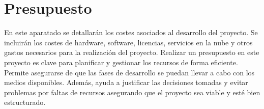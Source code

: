 \begin{table}[ht]
    \centering
    \caption{Tabla de tareas y horas}

\end{table}

\newpage

\section{Presupuesto}
\label{sec:presupuesto}
En este aparatado se detallarán los costes asociados al desarrollo del proyecto. Se incluirán los costes de hardware, software, licencias, servicios en la nube y otros gastos necesarios para la realización del proyecto.
Realizar un presupuesto en este proyecto es clave para planificar y gestionar los recursos de forma eficiente. Permite asegurarse de que las fases de desarrollo se puedan llevar a cabo con los medios disponibles. 
Además, ayuda a justificar las decisiones tomadas y evitar problemas por faltas de recursos asegurando que el proyecto sea viable y esté bien estructurado. 

